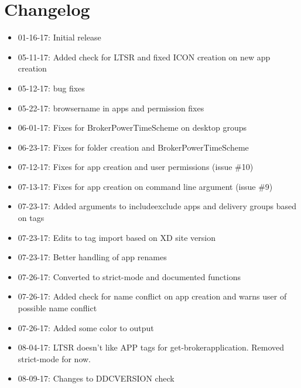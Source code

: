 \documentclass[letterpaper,10pt,english]{sphinxmanual}
\begin{document}
\chapter{Changelog}
\label{\detokenize{changelog:changelog}}\label{\detokenize{changelog::doc}}\begin{itemize}
\item {} 
01-16-17: Initial release

\item {} 
05-11-17: Added check for LTSR and fixed ICON creation on new app creation

\item {} 
05-12-17: bug fixes

\item {} 
05-22-17: browsername in apps and permission fixes

\item {} 
06-01-17: Fixes for BrokerPowerTimeScheme on desktop groups

\item {} 
06-23-17: Fixes for folder creation and BrokerPowerTimeScheme

\item {} 
07-12-17: Fixes for app creation and user permissions (issue \#10)

\item {} 
07-13-17: Fixes for app creation on command line argument (issue \#9)

\item {} 
07-23-17: Added arguments to includeexclude apps and delivery groups based on tags

\item {} 
07-23-17: Edits to tag import based on XD site version

\item {} 
07-23-17: Better handling of app renames

\item {} 
07-26-17: Converted to strict-mode and documented functions

\item {} 
07-26-17: Added check for name conflict on app creation and warns user of possible name conflict

\item {} 
07-26-17: Added some color to output

\item {} 
08-04-17: LTSR doesn’t like APP tags for get-brokerapplication. Removed strict-mode for now.

\item {} 
08-09-17: Changes to DDCVERSION check


\end{itemize}
\end{document}
